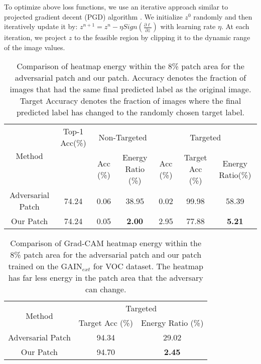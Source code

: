 \documentclass[10pt,twocolumn,letterpaper]{article}
\begin{document}
To optimize above loss functions, we use an iterative approach similar to  projected gradient decent (PGD) algorithm \cite{madry2017towards}. We initialize $z^0$ randomly and then iteratively update it by: $\displaystyle z^{n+1} = z^n - \eta Sign({\frac{\partial \ell}{\partial z}})$ with learning rate $\eta$. At each iteration, we project $z$ to the feasible region by clipping it to the dynamic range of the image values.
\begin{table*}[!t]
\centering
 \begin{tabular}{||c || c | c | c | c | c | c ||}
 \hline
 \multirow{2}{*}{Method} & Top-1 Acc(\%) & \multicolumn{2}{|c|}{Non-Targeted} & \multicolumn{3}{|c|}{Targeted} \\ [0.5ex]
 \cline{3-7}
 & & Acc (\%) & Energy Ratio (\%) & Acc (\%) & Target Acc (\%) & Energy Ratio(\%)\\
 \hline\hline
 Adversarial Patch \cite{brown2017adversarial} & 74.24 & 0.06 & 38.95 & 0.02 & 99.98 & 58.39   \\
 \hline
 Our Patch & 74.24 & 0.05 & \textbf{2.00} & 2.95 &77.88 & \textbf{5.21} \\
 \hline
\end{tabular}
\newline
    \caption{Comparison of heatmap energy within the 8\% patch area for the adversarial patch \cite{brown2017adversarial} and our patch. Accuracy denotes the fraction of images that had the same final predicted label as the original image. Target Accuracy denotes the fraction of images where the final predicted label has changed to the randomly chosen target label. %
    }
    \label{fig:comparison_patch_heatmap}
\end{table*}
\begin{table}[!t]
\centering
 \begin{tabular}{||c || c | c ||}
 \hline
 \multirow{2}{*}{Method} & \multicolumn{2}{|c|}{Targeted} \\ [0.5ex]
 \cline{2-3}
 & \footnotesize{Target Acc (\%)} & \footnotesize{Energy Ratio (\%)}\\
 \hline\hline
 Adversarial Patch \cite{brown2017adversarial} & 94.34 & 29.02   \\
 \hline
 Our Patch & 94.70 & \textbf{2.45} \\
 \hline
\end{tabular}
\newline
    \caption{Comparison of Grad-CAM heatmap energy within the 8\% patch area for the adversarial patch \cite{brown2017adversarial} and our patch trained on the GAIN{$_{ext}$} \cite{kunpeng2018gain} for VOC dataset. The heatmap has far less energy in the patch area that the adversary can change.
    }
    \label{fig:comparison_patch_heatmap_GAIN}
\end{table}
\end{document}
